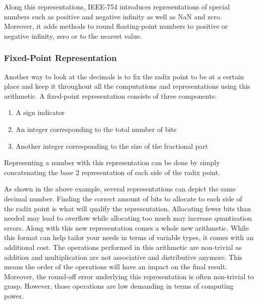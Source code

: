 Along this representations, IEEE-754 introduces representations of special numbers such as positive and negative infinity as well as NaN and zero. Moreover, it adds methods to round floating-point numbers to positive or negative infinity, zero or to the nearest value.

\subsubsection{Fixed-Point Representation}

Another way to look at the decimals is to fix the radix point to be at a certain place and keep it throughout all the computations and representations using this arithmetic. A fixed-point representation consists of three components:
\begin{enumerate}
  \item A sign indicator
  \item An integer corresponding to the total number of bits
  \item Another integer corresponding to the size of the fractional part
\end{enumerate}

Representing a number with this representation can be done by simply concatenating the base 2 representation of each side of the radix point.


As shown in the above example, several representations can depict the same decimal number. Finding the correct amount of bits to allocate to each side of the radix point is what will qualify the representation. Allocating fewer bits than needed may lead to overflow while allocating too much may increase quantisation errors.
Along with this new representation comes a whole new arithmetic. While this format can help tailor your needs in terms of variable types, it comes with an additional cost. The operations performed in this arithmetic are non-trivial as addition and multiplication are not associative and distributive anymore. This means the order of the operations will have an impact on the final result. Moreover, the round-off error underlying this representation is often non-trivial to grasp. However, those operations are low demanding in terms of computing power.

